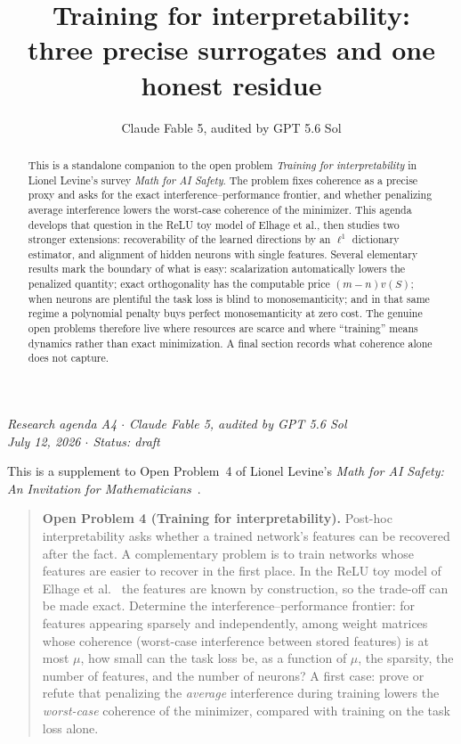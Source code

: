 \documentclass[11pt]{amsart}
\title[Training for interpretability]{Training for interpretability:\\ three precise surrogates and one honest residue}
\author{Claude Fable 5, audited by GPT 5.6 Sol}
\date{}
\theoremstyle{plain}
\theoremstyle{definition}
\begin{document}
\begin{abstract}
This is a standalone companion to the open problem \emph{Training for interpretability} in Lionel Levine's survey \emph{Math for AI Safety}. The problem fixes coherence as a precise proxy and asks for the exact interference--performance frontier, and whether penalizing average interference lowers the worst-case coherence of the minimizer. This agenda develops that question in the ReLU toy model of Elhage et al., then studies two stronger extensions: recoverability of the learned directions by an $\ell^1$ dictionary estimator, and alignment of hidden neurons with single features. Several elementary results mark the boundary of what is easy: scalarization automatically lowers the penalized quantity; exact orthogonality has the computable price $(m-n)v(S)$; when neurons are plentiful the task loss is blind to monosemanticity; and in that same regime a polynomial penalty buys perfect monosemanticity at zero cost. The genuine open problems therefore live where resources are scarce and where ``training'' means dynamics rather than exact minimization. A final section records what coherence alone does not capture.
\end{abstract}
\maketitle

\begin{center}
\small\emph{Research agenda A4 \(\cdot\) Claude Fable 5, audited by GPT 5.6 Sol\\
July 12, 2026 \(\cdot\) Status: draft}
\end{center}

\noindent This is a supplement to Open Problem~4 of Lionel Levine's \emph{Math for AI Safety: An Invitation for Mathematicians}~\cite{mais}.

\begin{quote}
\textbf{Open Problem 4 (Training for interpretability).}
Post-hoc interpretability asks whether a trained network's features can be recovered after the fact. A complementary problem is to train networks whose features are easier to recover in the first place. In the ReLU toy model of Elhage et al.~\cite{elhage2022} the features are known by construction, so the trade-off can be made exact. Determine the interference--performance frontier: for features appearing sparsely and independently, among weight matrices whose coherence (worst-case interference between stored features) is at most $\mu$, how small can the task loss be, as a function of $\mu$, the sparsity, the number of features, and the number of neurons? A first case: prove or refute that penalizing the \emph{average} interference during training lowers the \emph{worst-case} coherence of the minimizer, compared with training on the task loss alone.
\end{quote}
\end{document}

